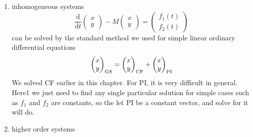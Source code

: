 \documentclass[12pt]{report}
\theoremstyle{definition}
\begin{document}
\begin{enumerate}[label = (\roman*)]
    \item inhomogeneous systems\[
        \frac{\mathrm{d}}{\mathrm{d}t} \begin{pmatrix}
                x \\
                y
        \end{pmatrix} - M\begin{pmatrix}
                x \\
                y
        \end{pmatrix} = \begin{pmatrix}
        f_1(t) \\
        f_2(t)
        \end{pmatrix}
    \]can be solved by the standard method we used for simple linear ordinary differential equations\[
        \begin{pmatrix}
                x \\
                y
            \end{pmatrix}_{\textnormal{GS}} = \begin{pmatrix}
                    x \\
                    y
                \end{pmatrix}_{\textnormal{CF}} + \begin{pmatrix}
                        x \\
                        y
                    \end{pmatrix}_{\textnormal{PI}}
    \]
    We solved CF earlier in this chapter. For PI, it is very difficult in general.
    Here1 we just need to find any single particular solution for simple cases such as
    $f_1$ and $f_2$ are constants, so the let PI be a constant vector, and solve for it will do.

\item higher order systems


\end{enumerate}
\end{document}
